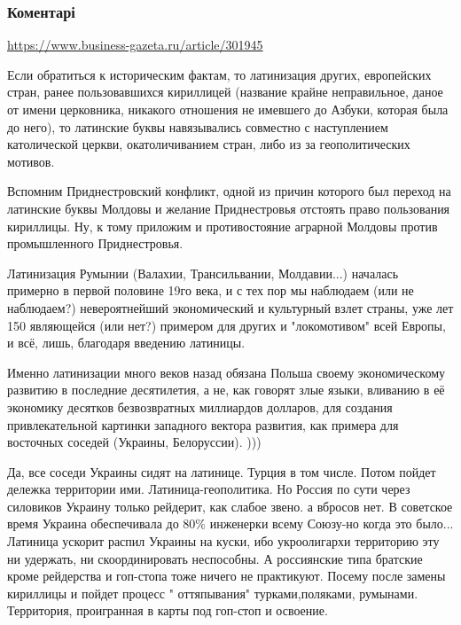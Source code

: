  
 
 
 
 
\subsubsection{Коментарі}
\label{sec:14_09_2021.fb.nikonov_sergej.1.latinica_danilov.cmt}

\begin{itemize} %
\url{https://www.business-gazeta.ru/article/301945}


Если обратиться к историческим фактам, то латинизация других, европейских
стран, ранее пользовавшихся кириллицей (название крайне неправильное, даное от
имени церковника, никакого отношения не имевшего до Азбуки, которая была до
него), то латинские буквы навязывались совместно с наступлением католической
церкви, окатоличиванием стран, либо из за геополитических мотивов.

Вспомним Приднестровский конфликт, одной из причин которого был переход на
латинские буквы Молдовы и желание Приднестровья отстоять право пользования
кириллицы. Ну, к тому приложим и противостояние аграрной Молдовы против
промышленного Приднестровья.

Латинизация Румынии (Валахии, Трансильвании, Молдавии...) началась примерно в
первой половине 19го века, и с тех пор мы наблюдаем (или не наблюдаем?)
невероятнейший экономический и культурный взлет страны, уже лет 150 являющейся
(или нет?) примером для других и "локомотивом" всей Европы, и всё, лишь,
благодаря введению латиницы.

Именно латинизации много веков назад обязана Польша своему экономическому
развитию в последние десятилетия, а не, как говорят злые языки, вливанию в её
экономику десятков безвозвратных миллиардов долларов, для создания
привлекательной картинки западного вектора развития, как примера для восточных
соседей (Украины, Белоруссии). )))


Да, все соседи Украины сидят на латинице. Турция в том числе. Потом пойдет
дележка территории ими. Латиница-геополитика. Но Россия по сути через силовиков
Украину только рейдерит, как слабое звено. а вбросов нет. В советское время
Украина обеспечивала до 80\% инженерки всему Союзу-но когда это было...
Латиница ускорит распил Украины на куски, ибо укроолигархи территорию эту ни
удержать, ни скоординировать неспособны. А россиянские типа братские кроме
рейдерства и гоп-стопа тоже ничего не практикуют. Посему после замены кириллицы
и пойдет процесс " оттяпывания" турками,поляками, румынами. Территория,
проигранная в карты под гоп-стоп и освоение.


\end{itemize}
